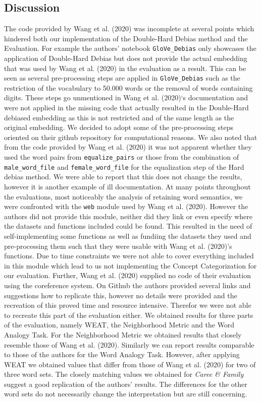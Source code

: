 \documentclass[
  english,
  man,floatsintext]{apa6}
\begin{document}
\hypertarget{discussion}{%
\subsection{Discussion}\label{discussion}}

The code provided by Wang et al. (2020) was incomplete at several points which hindered both our implementation of the Double-Hard Debias method and the Evaluation. For example the authors' notebook \texttt{GloVe\_Debias} only showcases the application of Double-Hard Debias but does not provide the actual embedding that was used by Wang et al. (2020) in the evaluation as a result. This can be seen as several pre-processing steps are applied in \texttt{GloVe\_Debias} such as the restriction of the vocabulary to 50.000 words or the removal of words containing digits. These steps go unmentioned in Wang et al. (2020)`s documentation and were not applied in the missing code that actually resulted in the Double-Hard debiased embedding as this is not restricted and of the same length as the original embedding. We decided to adopt some of the pre-processing steps oriented on their github repository for computational reasons.
We also noted that from the code provided by Wang et al. (2020) it was not apparent whether they used the word pairs from \texttt{equalize\_pairs} or those from the combination of \texttt{male\_word\_file} and \texttt{female\_word\_file} for the equalization step of the Hard debias method. We were able to report that this does not change the results, however it is another example of ill documentation.
At many points throughout the evaluations, most noticeably the analysis of retaining word semantics, we were confronted with the \texttt{web} module used by Wang et al. (2020). However the authors did not provide this module, neither did they link or even specify where the datasets and functions included could be found. This resulted in the need of self-implementing some functions as well as fundiing the datasets they used and pre-processing them such that they were usable with Wang et al. (2020)'s functions. Due to time constraints we were not able to cover everything included in this module which lead to us not implementing the Concept Categorization for our evaluation.
Further, Wang et al. (2020) supplied no code of their evaluation using the coreference system. On Github the authors provided several links and suggestions how to replicate this, however no details were provided and the recreation of this proved time and resource intensive. Therefor we were not able to recreate this part of the evaluation either.
We obtained results for three parts of the evaluation, namely WEAT, the Neighborhood Metric and the Word Analogy Task. For the Neighborhood Metric we obtained results that closely resemble those of Wang et al. (2020). Similarly we can report results comparable to those of the authors for the Word Analogy Task. However, after applying WEAT we obtained values that differ from those of Wang et al. (2020) for two of three word sets. The closely matching values we obtained for \emph{Caree \& Family} suggest a good replication of the authors' results. The differences for the other word sets do not necessarily change the interpretation but are still concerning.
\end{document}

